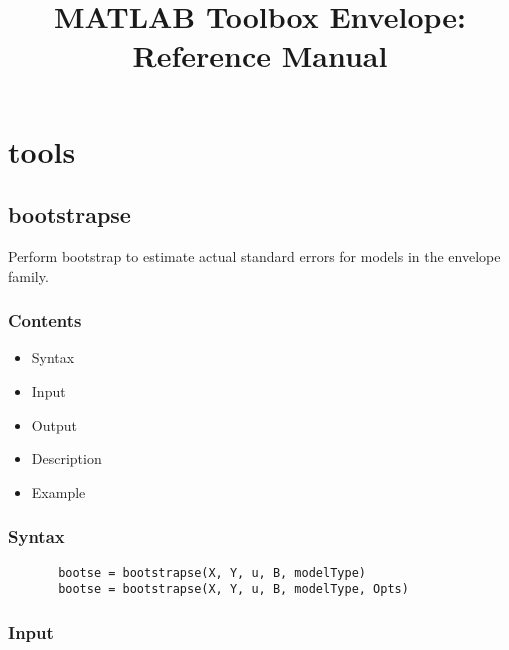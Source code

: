 \documentclass[a4paper,11pt,openany]{memoir}
\begin{document}
\title{MATLAB Toolbox Envelope: Reference Manual}

\maketitle



\setcounter{tocdepth}{2}
\tableofcontents


\newpage


\chapter{tools}

\rmfamily
\color{black}\section{bootstrapse}

\begin{par}
Perform bootstrap to estimate actual standard errors for models in the envelope family.
\end{par} \vspace{1em}

\subsection*{Contents}

\begin{itemize}
\setlength{\itemsep}{-1ex}
   \item Syntax
   \item Input
   \item Output
   \item Description
   \item Example
\end{itemize}


\subsection*{Syntax}


\begin{verbatim}       bootse = bootstrapse(X, Y, u, B, modelType)
       bootse = bootstrapse(X, Y, u, B, modelType, Opts)\end{verbatim}
    

\subsection*{Input}
\end{document}
